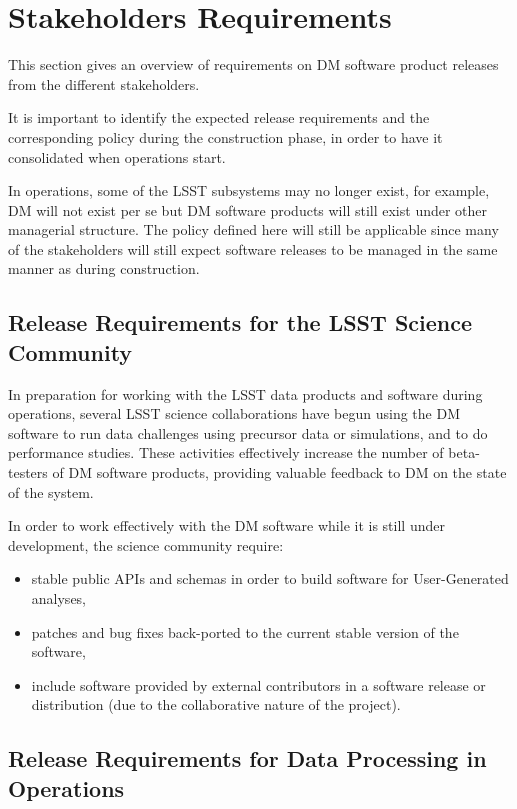 \section{Stakeholders Requirements} \label{sec:reqs}

This section gives an overview of requirements on \gls{DM} software product releases from the different stakeholders.

It is important to identify the expected release requirements and the corresponding policy during the construction phase, in order to have it consolidated when operations start.

In operations, some of the \gls{LSST} subsystems may no longer exist, for example, \gls{DM} will not exist per se but \gls{DM} software products will still exist under other managerial structure.
The policy defined here will still be applicable since many of the stakeholders will still expect software releases to be managed in the same manner as during construction.


\subsection{Release Requirements for the \gls{LSST} Science Community} \label{sec:comreqs}

In preparation for working with the \gls{LSST} data products and software during operations, several \gls{LSST} science collaborations have begun using the \gls{DM} software to run data challenges using precursor data or simulations, and to do performance studies. These activities effectively increase the number of beta-testers of \gls{DM} software products, providing valuable feedback to \gls{DM} on the state of the system. 

In order to work effectively with the \gls{DM} software while it is still under development, the science community require: 
\begin{itemize}
\item stable public APIs and schemas in order to build software for User-Generated analyses, 
\item patches and bug fixes back-ported to the current stable version of the software,
\item include software provided by external contributors in a software release or distribution (due to the collaborative nature of the project).
\end{itemize}


\subsection{Release Requirements for Data Processing in Operations} \label{sec:procreqs}

